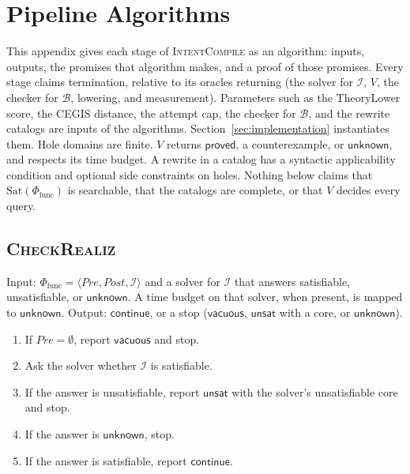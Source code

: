 \section{Pipeline Algorithms}
\label{app:algorithms}

This appendix gives each stage of \textsc{IntentCompile} as an algorithm:
inputs, outputs, the promises that algorithm makes, and a proof of those
promises. Every stage claims termination, relative to its oracles returning
(the solver for \(\mathcal{I}\), \(V\), the checker for \(\mathcal{B}\),
lowering, and measurement). Parameters such as the TheoryLower score, the
CEGIS distance, the attempt cap, the checker for \(\mathcal{B}\), and the
rewrite catalogs are inputs of the algorithms.
Section~\ref{sec:implementation} instantiates them. Hole domains are finite. \(V\) returns
\(\mathsf{proved}\), a counterexample, or \(\mathsf{unknown}\), and respects
its time budget. A rewrite in a catalog has a syntactic applicability
condition and optional side constraints on holes. Nothing below claims that
\(\mathrm{Sat}(\Phi_{\text{func}})\) is searchable, that the catalogs are
complete, or that \(V\) decides every query.

\subsection{\textsc{CheckRealiz}}

\begin{algo}
\label{alg:checkrealiz}
Input: \(\Phi_{\text{func}} = \langle \mathit{Pre}, \mathit{Post},
\mathcal{I}\rangle\) and a solver for \(\mathcal{I}\) that answers
satisfiable, unsatisfiable, or \(\mathsf{unknown}\). A time budget on that
solver, when present, is mapped to \(\mathsf{unknown}\).
Output: \(\mathsf{continue}\), or a stop
(\(\mathsf{vacuous}\), \(\mathsf{unsat}\) with a core, or
\(\mathsf{unknown}\)).
\begin{enumerate}
  \item If \(\mathit{Pre} = \emptyset\), report \(\mathsf{vacuous}\) and
  stop.
  \item Ask the solver whether \(\mathcal{I}\) is satisfiable.
  \item If the answer is unsatisfiable, report \(\mathsf{unsat}\) with the
  solver's unsatisfiable core and stop.
  \item If the answer is \(\mathsf{unknown}\), stop.
  \item If the answer is satisfiable, report \(\mathsf{continue}\).
\end{enumerate}
\end{algo}

